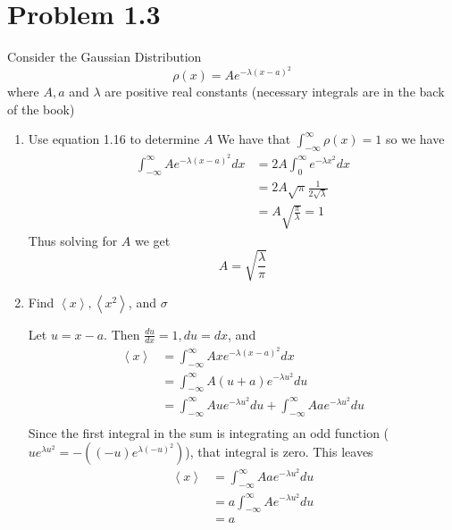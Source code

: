 \documentclass{article}
\newcommand{\braket}[1]{\left\langle #1 \right\rangle}
\begin{document}
\newcommand{\intinf}{\int_{-\infty}^\infty}
\newcommand{\intzinf}{\int_{0}^\infty}

\section{Problem 1.3}
  Consider the Gaussian Distribution
  \[
    \rho(x) = Ae^{-\lambda (x - a)^2}
  \]
  where $A, a$ and $\lambda$ are positive real constants (necessary integrals are in the back of the book)
  \begin{enumerate}[label=(\alph*)]
    \item Use equation 1.16 to determine $A$
      We have that $\intinf \rho(x) = 1$ so we have 
        \begin{align*}
          \intinf Ae^{-\lambda (x - a)^2} dx &= 2A\intzinf e^{-\lambda x^2} dx \\
                                                             &= 2A\sqrt{\pi}\frac1{2\sqrt{\lambda}} \\
                                                             &= A \sqrt{\frac\pi{\lambda}} = 1
        \end{align*}
        Thus solving for $A$ we get
        \[ A = \sqrt{\frac\lambda{\pi}} \]

    \item Find $\braket{x}, \braket{x^2}$, and $\sigma$
     
      Let $u = x-a$. Then $\frac{du}{dx} = 1, du = dx$, and
      \begin{align*}
        \braket{x} &= \intinf Axe^{-\lambda (x - a)^2}dx \\
                   &= \intinf A(u + a)e^{-\lambda u^2}du \\
                   &= \intinf Aue^{-\lambda u^2}du + \intinf Aae^{-\lambda u^2}du \\
      \end{align*}
      Since the first integral in the sum is integrating an odd function ($ue^{\lambda u^2} = -( (-u)e^{\lambda (-u)^2})$), that integral is zero. This leaves
      \begin{align*}
        \braket{x} &= \intinf Aae^{-\lambda u^2}du \\
                   &= a \intinf Ae^{-\lambda u^2}du \\
                   &= a
      \end{align*}
      

\end{enumerate}
\end{document}
